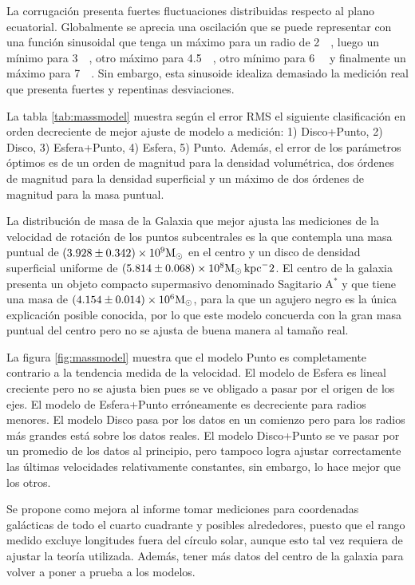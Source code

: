 La corrugación presenta fuertes fluctuaciones distribuidas respecto al plano ecuatorial. Globalmente se aprecia una oscilación que se puede representar con una función sinusoidal que tenga un máximo para un radio de \SI{2}{\kilo\parsec}, luego un mínimo para \SI{3}{\kilo\parsec}, otro máximo para \SI{4.5}{\kilo\parsec}, otro mínimo para \SI{6}{\kilo\parsec} y finalmente un máximo para \SI{7}{\kilo\parsec}. Sin embargo, esta sinusoide idealiza demasiado la medición real que presenta fuertes y repentinas desviaciones.

La tabla \ref{tab:massmodel} muestra según el error RMS el siguiente clasificación en orden decreciente de mejor ajuste de modelo a medición: 1) Disco+Punto, 2) Disco, 3) Esfera+Punto, 4) Esfera, 5) Punto. Además, el error de los parámetros óptimos es de un orden de magnitud para la densidad volumétrica, dos órdenes de magnitud para la densidad superficial y un máximo de dos órdenes de magnitud para la masa puntual.

La distribución de masa de la Galaxia que mejor ajusta las mediciones de la velocidad de rotación de los puntos subcentrales es la que contempla una masa puntual de $(3.928\pm0.342)\times10^9\textnormal{M}_\odot$ en el centro y un disco de densidad superficial uniforme de $(5.814\pm0.068)\times10^8\textnormal{M}_\odot\,\textnormal{kpc}^-2$. El centro de la galaxia presenta un objeto compacto supermasivo denominado Sagitario A$^\ast$ y que tiene una masa de $(4.154\pm0.014)\times10^6\textnormal{M}_\odot$, para la que un agujero negro es la única explicación posible conocida, por lo que este modelo concuerda con la gran masa puntual del centro pero no se ajusta de buena manera al tamaño real.

La figura \ref{fig:massmodel} muestra que el modelo Punto es completamente contrario a la tendencia medida de la velocidad. El modelo de Esfera es lineal creciente pero no se ajusta bien pues se ve obligado a pasar por el origen de los ejes. El modelo de Esfera+Punto erróneamente es decreciente para radios menores. El modelo Disco pasa por los datos en un comienzo pero para los radios más grandes está sobre los datos reales. El modelo Disco+Punto se ve pasar por un promedio de los datos al principio, pero tampoco logra ajustar correctamente las últimas velocidades relativamente constantes, sin embargo, lo hace mejor que los otros.

Se propone como mejora al informe tomar mediciones para coordenadas galácticas de todo el cuarto cuadrante y posibles alrededores, puesto que el rango medido excluye longitudes fuera del círculo solar, aunque esto tal vez requiera de ajustar la teoría utilizada. Además, tener más datos del centro de la galaxia para volver a poner a prueba a los modelos.

